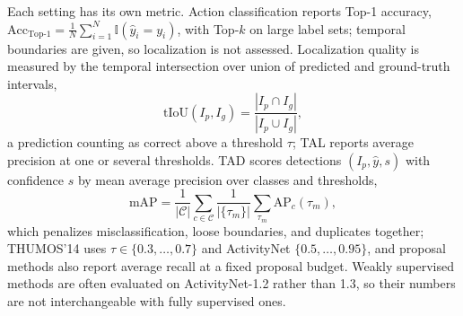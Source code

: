 Each setting has its own metric. Action classification reports Top-1 accuracy, $\mathrm{Acc}_{\mathrm{Top}\text{-}1} = \frac{1}{N} \sum_{i=1}^{N} \mathbb{I}(\hat{y}_i = y_i)$, with Top-$k$ on large label sets; temporal boundaries are given, so localization is not assessed. Localization quality is measured by the temporal intersection over union of predicted and ground-truth intervals,
\begin{equation}
    \mathrm{tIoU}(I_p, I_g) =
    \frac{|I_p \cap I_g|}{|I_p \cup I_g|},
\end{equation}
a prediction counting as correct above a threshold $\tau$; TAL reports average precision at one or several thresholds. TAD scores detections $(I_p, \hat{y}, s)$ with confidence $s$ by mean average precision over classes and thresholds,
\begin{equation}
    \mathrm{mAP} = \frac{1}{|\mathcal{C}|}
    \sum_{c \in \mathcal{C}}
    \frac{1}{|\{\tau_m\}|}
    \sum_{\tau_m} \mathrm{AP}_c(\tau_m),
\end{equation}
which penalizes misclassification, loose boundaries, and duplicates together; THUMOS'14 uses $\tau \in \{0.3,\dots,0.7\}$ and ActivityNet $\{0.5,\dots,0.95\}$, and proposal methods also report average recall at a fixed proposal budget. Weakly supervised methods are often evaluated on ActivityNet-1.2 rather than 1.3, so their numbers are not interchangeable with fully supervised ones.

